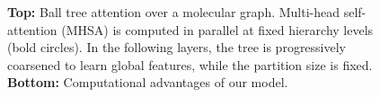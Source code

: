 \begin{figure}[t!]

\vspace{-1pt}
\caption{\textbf{Top:} Ball tree attention over a molecular graph. Multi-head self-attention (MHSA) is computed in parallel at fixed hierarchy levels (bold circles). In the following layers, the tree is progressively coarsened to learn global features, while the partition size is fixed. \textbf{Bottom:} Computational advantages of our model.}
\vspace{-3pt}
\end{figure}
